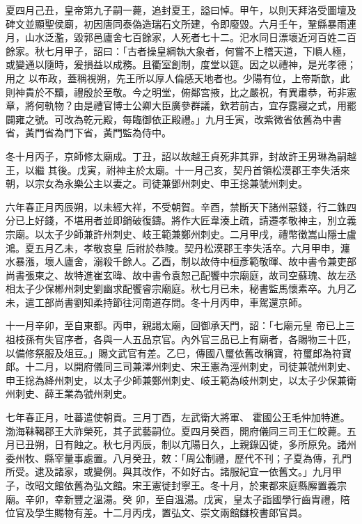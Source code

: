 \begin{pinyinscope}
 夏四月己丑，皇帝第九子嗣一薨，追封夏王，謚曰悼。甲午，以則天拜洛受圖壇及碑文並顯聖侯廟，初因唐同泰偽造瑞石文所建，令即廢毀。六月壬午，鞏縣暴雨連月，山水泛濫，毀郭邑廬舍七百餘家，人死者七十二。汜水同日漂壞近河百姓二百餘家。秋七月甲子，詔曰：「古者操皇綱執大象者，何嘗不上稽天道，下順人極，或變通以隨時，爰損益以成務。且衢室創制，度堂以筵。因之以禮神，是光孝德；用之
 以布政，蓋稱視朔，先王所以厚人倫感天地者也。少陽有位，上帝斯歆，此則神貴於不黷，禮殷於至敬。今之明堂，俯鄰宮掖，比之嚴祝，有異肅恭，茍非憲章，將何軌物？由是禮官博士公卿大臣廣參群議，欽若前古，宜存露寢之式，用罷闢雍之號。可改為乾元殿，每臨御依正殿禮。」九月壬寅，改紫微省依舊為中書省，黃門省為門下省，黃門監為侍中。



 冬十月丙子，京師修太廟成。丁丑，詔以故越王貞死非其罪，封故許王男琳為嗣越王，以繼
 其後。戊寅，祔神主於太廟。十一月己亥，契丹首領松漠郡王李失活來朝，以宗女為永樂公主以妻之。司徒兼鄧州刺史、申王捴兼虢州刺史。



 六年春正月丙辰朔，以未經大祥，不受朝賀。辛酉，禁斷天下諸州惡錢，行二銖四分已上好錢，不堪用者並即銷破復鑄。將作大匠韋湊上疏，請遷孝敬神主，別立義宗廟。以太子少師兼許州刺史、岐王範兼鄭州刺史。二月甲戌，禮幣徵嵩山隱士盧鴻。夏五月乙未，孝敬哀皇
 后祔於恭陵。契丹松漠郡王李失活卒。六月甲申，瀍水暴漲，壞人廬舍，溺殺千餘人。乙酉，制以故侍中桓彥範敬暉、故中書令兼吏部尚書張柬之、故特進崔玄暐、故中書令袁恕己配饗中宗廟庭，故司空蘇瑰、故左丞相太子少保郴州刺史劉幽求配饗睿宗廟庭。秋七月已未，秘書監馬懷素卒。九月乙未，遣工部尚書劉知柔持節往河南道存問。冬十月丙申，車駕還京師。



 十一月辛卯，至自東都。丙申，親謁太廟，回御承天門，詔：「七廟元皇
 帝已上三祖枝孫有失官序者，各與一人五品京官。內外官三品已上有廟者，各賜物三十匹，以備修祭服及俎豆。」賜文武官有差。乙巳，傳國八璽依舊改稱寶，符璽郎為符寶郎。十二月，以開府儀同三司兼澤州刺史、宋王憲為涇州刺史，司徒兼虢州刺史、申王捴為絳州刺史，以太子少師兼鄭州刺史、岐王範為岐州刺史，以太子少保兼衛州刺史、薛王業為虢州刺史。



 七年春正月，吐蕃遣使朝貢。三月丁酉，左武衛大將軍、
 霍國公王毛仲加特進。渤海靺鞨郡王大祚榮死，其子武藝嗣位。夏四月癸酉，開府儀同三司王仁皎薨。五月已丑朔，日有蝕之。秋七月丙辰，制以亢陽日久，上親錄囚徙，多所原免。諸州委州牧、縣宰量事處置。八月癸丑，敕：「周公制禮，歷代不刊；子夏為傳，孔門所受。逮及諸家，或變例。與其改作，不如好古。諸服紀宜一依舊文。」九月甲子，改昭文館依舊為弘文館。宋王憲徙封寧王。冬十月，於東都來庭縣廨置義宗廟。辛卯，幸新豐之溫湯。癸
 卯，至自溫湯。戊寅，皇太子詣國學行齒胄禮，陪位官及學生賜物有差。十二月丙戌，置弘文、崇文兩館讎校書郎官員。




\end{pinyinscope}

